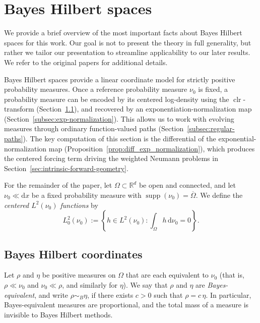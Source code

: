 \documentclass{article}
\theoremstyle{definition}
\DeclareMathOperator{\clr}{clr}
\DeclareMathOperator{\supp}{supp}
\renewcommand{\d}{\mathrm{d}}
\begin{document}

\section{Bayes Hilbert spaces}
\label{sec:bayes-hilbert-spaces}

We provide a brief overview of the most important facts about Bayes Hilbert spaces for this work. Our goal is not to present the theory in full generality, but rather we tailor our presentation to streamline applicability to our later results. We refer to the original papers \citep{vandenboogaartBayesLinearSpaces2010,van_den_boogaart_bayes_2014} for additional details.

Bayes Hilbert spaces provide a linear coordinate model for strictly positive probability
measures.
Once a reference probability measure $\nu_0$ is
fixed, a probability measure can be encoded by its centered log-density using the $\clr$-transform
(Section~\ref{subsec:bayes-hilbert-coordinates}), and recovered by an exponentiation-normalization map
(Section~\ref{subsec:exp-normalization}).
This allows us to work with evolving measures through
ordinary function-valued paths (Section~\ref{subsec:regular-paths}).
The key computation of this section is the differential of the exponential-normalization map (Proposition~\ref{prop:diff_exp_normalization}), which produces the centered forcing term driving the weighted Neumann problems in Section~\ref{sec:intrinsic-forward-geometry}.

For the remainder of the paper, let $\Omega \subset \mathbb{R}^d$ be open and connected, and let \(\nu_0 \ll \d x\) be a fixed probability measure with \(\supp(\nu_0)=\overline{\Omega}\).
We define the \emph{centered $L^2(\nu_0)$ functions} by
\[
    L^2_0(\nu_0)
    :=
    \left\{
    h\in L^2(\nu_0) : \int_\Omega h\,\d\nu_0 = 0
    \right\}.
\]

\subsection{Bayes Hilbert coordinates}
\label{subsec:bayes-hilbert-coordinates}

Let \(\rho\) and \(\eta\) be positive measures on $\Omega$ that are each equivalent to \(\nu_0\) (that is, $\rho \ll \nu_0$ and $\nu_0 \ll \rho$, and similarly for $\eta$).
We say that \(\rho\) and \(\eta\) are \emph{Bayes-equivalent}, and write \(\rho\sim_B \eta\), if there exists \(c>0\) such that \(\rho=c\,\eta\). In particular, Bayes-equivalent measures are proportional, and the total mass of a measure is invisible to Bayes Hilbert methods.
\end{document}
